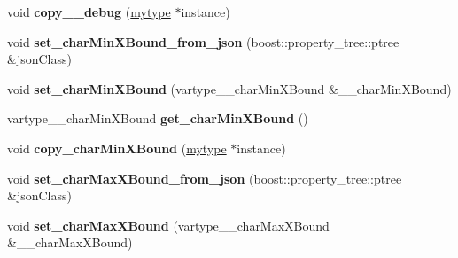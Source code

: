 \begin{DoxyCompactItemize}
\item 
\mbox{\label{classfilter_1_1algos_1_1_i_d_plate_rectifier_a7070a64d060907bf7cb9f28af8e90f88}} 
void {\bfseries copy\+\_\+\+\_\+debug} (\hyperlink{classfilter_1_1algos_1_1_i_d_plate_rectifier}{mytype} $\ast$instance)
\item 
\mbox{\label{classfilter_1_1algos_1_1_i_d_plate_rectifier_a56493291945485661bb0bd1537ae08c8}} 
void {\bfseries set\+\_\+char\+Min\+X\+Bound\+\_\+from\+\_\+json} (boost\+::property\+\_\+tree\+::ptree \&json\+Class)
\item 
\mbox{\label{classfilter_1_1algos_1_1_i_d_plate_rectifier_a6d575b0690db9c64d8f9f1903f878d25}} 
void {\bfseries set\+\_\+char\+Min\+X\+Bound} (vartype\+\_\+\+\_\+char\+Min\+X\+Bound \&\+\_\+\+\_\+char\+Min\+X\+Bound)
\item 
\mbox{\label{classfilter_1_1algos_1_1_i_d_plate_rectifier_aee3000ee679b415735a3e735f8a7e2f7}} 
vartype\+\_\+\+\_\+char\+Min\+X\+Bound {\bfseries get\+\_\+char\+Min\+X\+Bound} ()
\item 
\mbox{\label{classfilter_1_1algos_1_1_i_d_plate_rectifier_aa671ae16a0efe8aaeb75ccd1ae596a76}} 
void {\bfseries copy\+\_\+char\+Min\+X\+Bound} (\hyperlink{classfilter_1_1algos_1_1_i_d_plate_rectifier}{mytype} $\ast$instance)
\item 
\mbox{\label{classfilter_1_1algos_1_1_i_d_plate_rectifier_ac0fd3945e468fab68316dafb2b85c36c}} 
void {\bfseries set\+\_\+char\+Max\+X\+Bound\+\_\+from\+\_\+json} (boost\+::property\+\_\+tree\+::ptree \&json\+Class)
\item 
\mbox{\label{classfilter_1_1algos_1_1_i_d_plate_rectifier_a4089754c4ce0da7fd7dfa2dff7e0d783}} 
void {\bfseries set\+\_\+char\+Max\+X\+Bound} (vartype\+\_\+\+\_\+char\+Max\+X\+Bound \&\+\_\+\+\_\+char\+Max\+X\+Bound)
\item 
\mbox{\label{classfilter_1_1algos_1_1_i_d_plate_rectifier_ab593d358c8757f7e27c84486abd354a6}} 

\end{DoxyCompactItemize}
